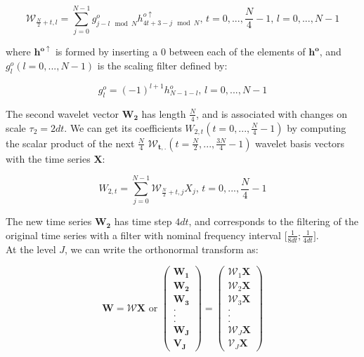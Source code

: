 \documentclass[main.tex]{subfiles}
\begin{document}
\begin{equation}
\mathcal{W}_{\frac{N}{2} + t , l} = \sum_{j = 0}^{N - 1} g_{j - l \mod N}^o h_{4 t + 3 - j \mod N}^{o \uparrow} \text{, } t = 0 , ... , \frac{N}{4} - 1 \text{, } l = 0 , ... , N - 1
\end{equation}

where $\bm{h^{o \uparrow}}$ is formed by inserting a $0$ between each of the elements of $\bm{h^o}$, and $g_l^o \left( l = 0 , ... , N - 1 \right)$ is the scaling filter defined by:

\begin{equation}
g_l^o = \left( - 1 \right) ^{l + 1} h_{N - 1 - l}^o \text{, } l = 0 , ... , N - 1
\end{equation}

The second wavelet vector $\bm{W_2}$ has length $\frac{N}{4}$, and is associated with changes on scale $\tau_2 = 2 dt$. We can get its coefficients $W_{2 , t} \left( t = 0 , ... , \frac{N}{4} - 1 \right)$ by computing the scalar product of the next $\frac{N}{4}$ $\bm{\mathcal{W}_{t , .}} \left( t = \frac{N}{2} , ... , \frac{3 N}{4} - 1 \right)$ wavelet basis vectors with the time series $\bm{X}$:

\begin{equation}
W_{2 , t} = \sum_{j = 0}^{N - 1} \mathcal{W}_{\frac{N}{2} + t , j} X_j \text{, } t = 0 , ... , \frac{N}{4} - 1
\end{equation}

The new time series $\bm{W_2}$ has time step $4 dt$, and corresponds to the filtering of the original time series with a filter with nominal frequency interval $\lbrack \frac{1}{8 dt} ; \frac{1}{4 dt} \rbrack$. \\

At the level $J$, we can write the orthonormal transform as:

\begin{equation}
\bm{W} = \mathcal{W} \bm{X} \text{ or } \begin{pmatrix} \bm{W_1} \\ \bm{W_2} \\ \bm{W_3} \\ . \\ . \\ . \\ \bm{W_J} \\ \bm{V_J} \end{pmatrix}
= \begin{pmatrix} \mathcal{W}_1 \bm{X} \\ \mathcal{W}_2 \bm{X} \\ \mathcal{W}_3 \bm{X} \\ . \\ . \\ . \\ \mathcal{W}_J \bm{X} \\ \mathcal{V}_J \bm{X} \end{pmatrix}
\end{equation}
\end{document}
